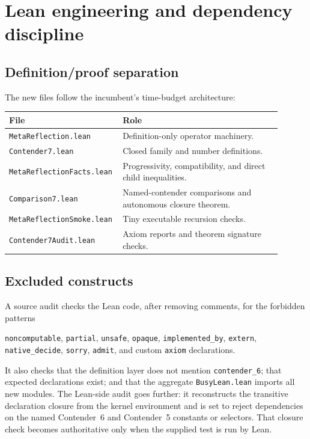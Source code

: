 \documentclass[11pt]{article}
\theoremstyle{definition}
\theoremstyle{remark}
\newcommand{\lean}[1]{\texttt{#1}}
\newcommand{\codepath}[1]{\texttt{#1}}
\begin{document}
\section{Lean engineering and dependency discipline}
\label{sec:engineering}

\subsection{Definition/proof separation}

The new files follow the incumbent's time-budget architecture:
\begin{center}
\begin{tabular}{p{0.32\linewidth}p{0.58\linewidth}}
\toprule
File & Role\\
\midrule
\codepath{MetaReflection.lean}
  & Definition-only operator machinery.\\
\codepath{Contender7.lean}
  & Closed family and number definitions.\\
\codepath{MetaReflectionFacts.lean}
  & Progressivity, compatibility, and direct child inequalities.\\
\codepath{Comparison7.lean}
  & Named-contender comparisons and autonomous closure theorem.\\
\codepath{MetaReflectionSmoke.lean}
  & Tiny executable recursion checks.\\
\codepath{Contender7Audit.lean}
  & Axiom reports and theorem signature checks.\\
\bottomrule
\end{tabular}
\end{center}

\subsection{Excluded constructs}

A source audit checks the Lean code, after removing comments, for the forbidden
patterns
\begin{center}
\lean{noncomputable}, \lean{partial}, \lean{unsafe}, \lean{opaque},
\lean{implemented\_by}, \lean{extern}, \lean{native\_decide},
\lean{sorry}, \lean{admit}, and custom \lean{axiom} declarations.
\end{center}
It also checks that the definition layer does not mention
\lean{contender\_6}; that expected declarations exist; and that the aggregate
\codepath{BusyLean.lean} imports all new modules.  The Lean-side audit goes
further: it reconstructs the transitive declaration closure from the kernel
environment and is set to reject dependencies on the named Contender~6 and
Contender~5 constants or selectors.  That closure check becomes authoritative
only when the supplied test is run by Lean.
\end{document}
